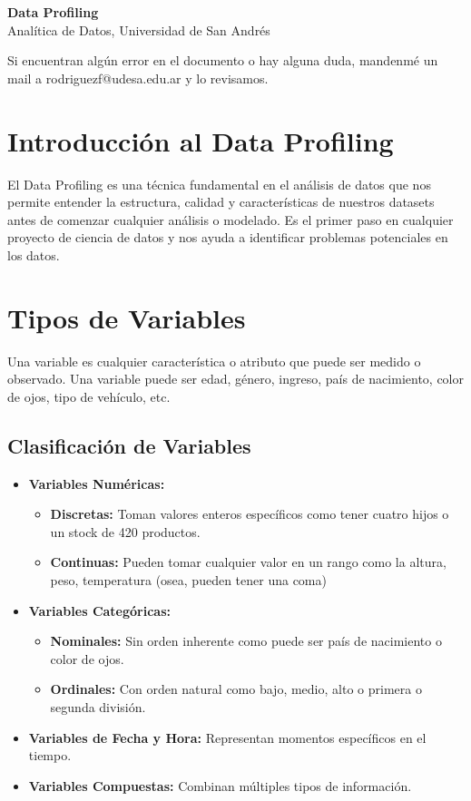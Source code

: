 \documentclass[12pt]{article}
\begin{document}
\begin{center}
  {\LARGE \textbf{Data Profiling}}\\[0.5em]
  {Analítica de Datos, Universidad de San Andrés}
\end{center}

Si encuentran algún error en el documento o hay alguna duda, mandenmé un mail a rodriguezf@udesa.edu.ar y lo revisamos.

\section{Introducción al Data Profiling}
El Data Profiling es una técnica fundamental en el análisis de datos que nos permite entender la estructura, calidad y características de nuestros datasets antes de comenzar cualquier análisis o modelado. Es el primer paso en cualquier proyecto de ciencia de datos y nos ayuda a identificar problemas potenciales en los datos.

\section{Tipos de Variables}
Una variable es cualquier característica o atributo que puede ser medido o observado. Una variable puede ser edad, género, ingreso, país de nacimiento, color de ojos, tipo de vehículo, etc.

\subsection{Clasificación de Variables}
\begin{itemize}
    \item \textbf{Variables Numéricas:}
    \begin{itemize}
        \item \textbf{Discretas:} Toman valores enteros específicos como tener cuatro hijos o un stock de 420 productos.
        \item \textbf{Continuas:} Pueden tomar cualquier valor en un rango como la altura, peso, temperatura (osea, pueden tener una coma)
    \end{itemize}
    \item \textbf{Variables Categóricas:}
    \begin{itemize}
        \item \textbf{Nominales:} Sin orden inherente como puede ser país de nacimiento o color de ojos.
        \item \textbf{Ordinales:} Con orden natural como bajo, medio, alto o primera o segunda división.
    \end{itemize}
    \item \textbf{Variables de Fecha y Hora:} Representan momentos específicos en el tiempo.
    \item \textbf{Variables Compuestas:} Combinan múltiples tipos de información.
\end{itemize}
\end{document}

